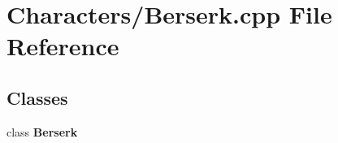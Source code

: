 \section{Characters/\-Berserk.cpp File Reference}
\label{_berserk_8cpp}
\subsection*{Classes}
\begin{DoxyCompactItemize}
\item 
class {\bf Berserk}
\end{DoxyCompactItemize}
